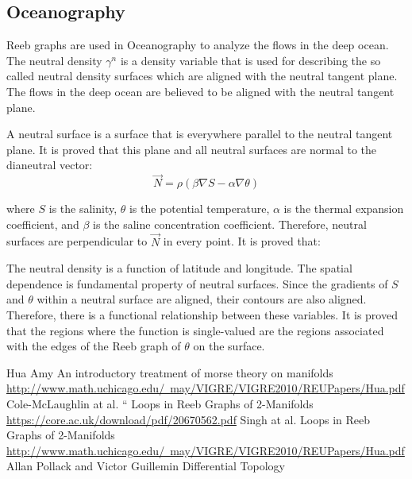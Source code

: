 \documentclass[]{article}
\begin{document}
\subsection{Oceanography}
    Reeb graphs are used in Oceanography to analyze the flows in the deep ocean. The neutral density $\gamma^n$ is a density variable that is used 
    for describing the so called neutral density surfaces which are aligned with the neutral tangent plane. The flows in the deep ocean are believed to be aligned with the neutral
    tangent plane.

    A neutral surface is a surface that is everywhere parallel to the neutral tangent plane. It is proved that this plane and all neutral surfaces are normal to
    the dianeutral vector:
   $$
    \vec{N}=\rho(\beta \nabla S-\alpha \nabla\theta)
   $$

   where $S$ is the salinity, $\theta$ is the potential temperature, $\alpha$ is the thermal expansion coefficient,
   and $\beta$ is the saline concentration coefficient. Therefore, neutral surfaces are perpendicular to $\vec{N}$ in every point. It is proved that:

   The neutral density is a function of latitude and longitude. The spatial dependence is fundamental property
   of neutral surfaces. Since the gradients of $S$ and $\theta$ within a neutral surface are aligned, their contours are also aligned.
   Therefore, there is a functional relationship between these variables. It is proved that the regions where
   the function is single-valued are the regions associated with the edges of the Reeb graph of $\theta$ on the surface.

\begin{thebibliography}{9}
     {\sc Hua Amy}
       An introductory treatment of morse theory on manifolds
       \href{http://www.math.uchicago.edu/~may/VIGRE/VIGRE2010/REUPapers/Hua.pdf}{http://www.math.uchicago.edu/~may/VIGRE/VIGRE2010/REUPapers/Hua.pdf}
     {\sc Cole-McLaughlin at al.} 
       `` Loops in Reeb Graphs of 2-Manifolds  \href{https://core.ac.uk/download/pdf/20670562.pdf}{https://core.ac.uk/download/pdf/20670562.pdf}
         {\sc Singh at al. }
          Loops in Reeb Graphs of 2-Manifolds \href{http://www.math.uchicago.edu/~may/VIGRE/VIGRE2010/REUPapers/Hua.pdf}{http://www.math.uchicago.edu/~may/VIGRE/VIGRE2010/REUPapers/Hua.pdf}
        {\sc Allan Pollack and Victor Guillemin } 
        Differential Topology
\end{thebibliography}
\end{document}
